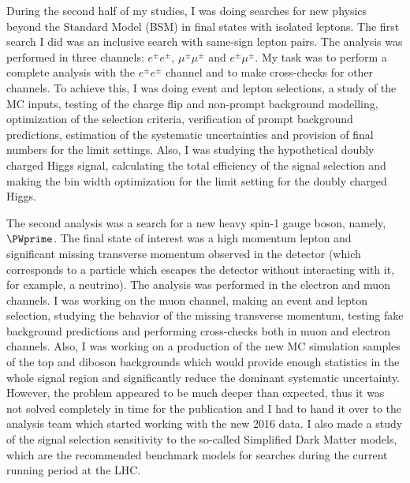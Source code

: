 \begin{preface}
During the second half of my studies, I was doing searches for new physics beyond the Standard Model (BSM) in final states with isolated leptons. The first search I did was an inclusive search with same-sign lepton pairs. The analysis was performed in three channels: $e^{\pm}e^{\pm}$, $\mu^{\pm}\mu^{\pm}$ and $e^{\pm}\mu^{\pm}$. My task was to perform a complete analysis with the $e^{\pm}e^{\pm}$ channel and to make cross-checks for other channels. To achieve this, I was doing event and lepton selections, a study of the MC inputs, testing of the charge flip and non-prompt background modelling, optimization of the selection criteria, verification of prompt background predictions, estimation of the systematic uncertainties and provision of final numbers for the limit settings. Also, I was studying the hypothetical doubly charged Higgs signal, calculating the total efficiency of the signal selection and making the bin width optimization for the limit setting for the doubly charged Higgs.

The second analysis was a search for a new heavy spin-1 gauge boson, namely, $\PWprime$. The final state of interest was a high momentum lepton and significant missing transverse momentum observed in the detector (which corresponds to a particle which escapes the detector without interacting with it, for example, a neutrino). The analysis was performed in the electron and muon channels.
I was working on the muon channel, making an event and lepton selection, studying the behavior of the missing transverse momentum, testing fake background predictions and performing cross-checks both in muon and electron channels. Also, I was working on a production of the new MC simulation samples of the top and diboson backgrounds which would provide enough statistics in the whole signal region and significantly reduce the dominant systematic uncertainty. However, the problem appeared to be much deeper than expected, thus it was not solved completely in time for the publication and I had to hand it over to the analysis team which started working with the new 2016 data.
I also made a study of the signal selection sensitivity to the so-called Simplified Dark Matter models, which are the recommended 
benchmark models for searches during the current running period at the LHC.


\end{preface}
